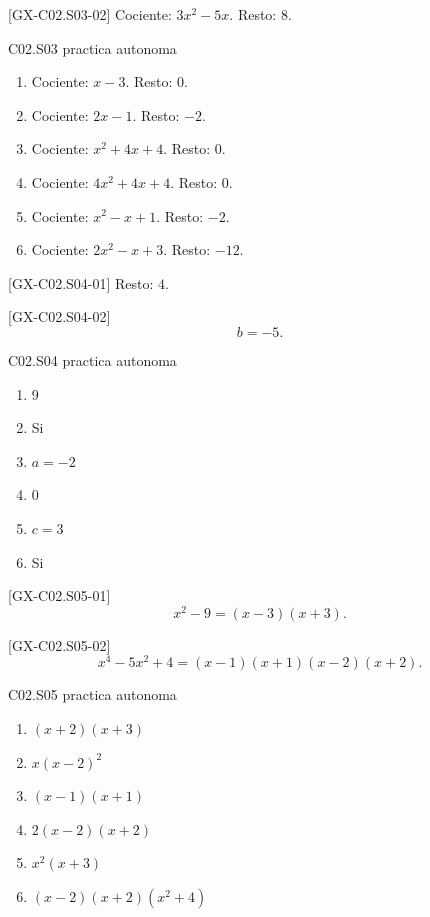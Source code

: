 \begin{shortanswer}{[GX-C02.S03-02]}
Cociente: \(3x^2-5x\). Resto: \(8\).
\end{shortanswer}

\begin{shortanswer}{C02.S03 practica autonoma}
\begin{enumerate}[label=\textbf{PX-C02.S03-\arabic*:}, leftmargin=*]
  \item Cociente: \(x-3\). Resto: \(0\).
  \item Cociente: \(2x-1\). Resto: \(-2\).
  \item Cociente: \(x^2+4x+4\). Resto: \(0\).
  \item Cociente: \(4x^2+4x+4\). Resto: \(0\).
  \item Cociente: \(x^2-x+1\). Resto: \(-2\).
  \item Cociente: \(2x^2-x+3\). Resto: \(-12\).
\end{enumerate}
\end{shortanswer}

\begin{shortanswer}{[GX-C02.S04-01]}
Resto: \(4\).
\end{shortanswer}

\begin{shortanswer}{[GX-C02.S04-02]}
\[
b=-5.
\]
\end{shortanswer}

\begin{shortanswer}{C02.S04 practica autonoma}
\begin{enumerate}[label=\textbf{PX-C02.S04-\arabic*:}, leftmargin=*]
  \item \(9\)
  \item Si
  \item \(a=-2\)
  \item \(0\)
  \item \(c=3\)
  \item Si
\end{enumerate}
\end{shortanswer}

\begin{shortanswer}{[GX-C02.S05-01]}
\[
x^2-9=(x-3)(x+3).
\]
\end{shortanswer}

\begin{shortanswer}{[GX-C02.S05-02]}
\[
x^4-5x^2+4=(x-1)(x+1)(x-2)(x+2).
\]
\end{shortanswer}

\begin{shortanswer}{C02.S05 practica autonoma}
\begin{enumerate}[label=\textbf{PX-C02.S05-\arabic*:}, leftmargin=*]
  \item \((x+2)(x+3)\)
  \item \(x(x-2)^2\)
  \item \((x-1)(x+1)\)
  \item \(2(x-2)(x+2)\)
  \item \(x^2(x+3)\)
  \item \((x-2)(x+2)(x^2+4)\)
\end{enumerate}
\end{shortanswer}

